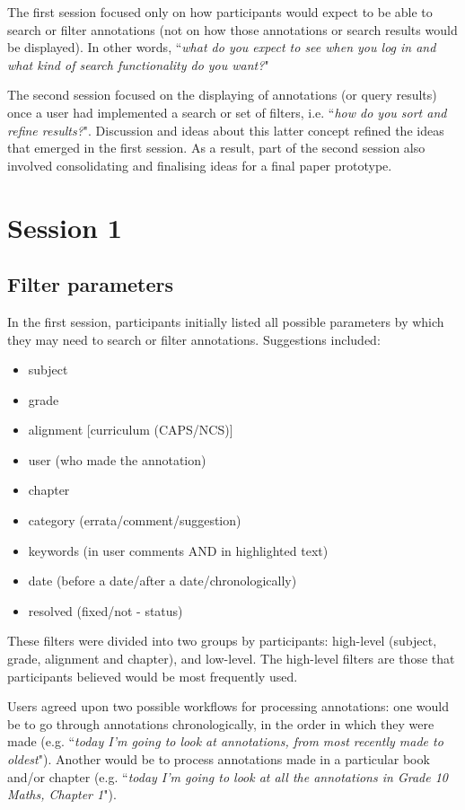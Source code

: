 The first session focused only on how participants would expect to be able to search or filter annotations (not on how those annotations or search results would be displayed). In other words, ``\textit{what do you expect to see when you log in and what kind of search functionality do you want?}"

The second session focused on the displaying of annotations (or query results) once a user had implemented a search or set of filters, i.e. ``\textit{how do you sort and refine results?}". Discussion and ideas about this latter concept refined the ideas that emerged in the first session. As a result, part of the second session also involved consolidating and finalising ideas for a final paper prototype.

\section{Session 1}

\subsection{Filter parameters}
In the first session, participants initially listed all possible parameters by which they may need to search or filter annotations. Suggestions included:
\begin{itemize}
\item subject
\item grade
\item alignment [curriculum (CAPS/NCS)]
\item user (who made the annotation)
\item chapter
\item category (errata/comment/suggestion)
\item keywords (in user comments AND in highlighted text)
\item date (before a date/after a date/chronologically)
\item resolved (fixed/not - status)
\end{itemize}

These filters were divided into two groups by participants: high-level (subject, grade, alignment and chapter), and low-level. The high-level filters are those that participants believed would be most frequently used. 

Users agreed upon two possible workflows for processing annotations: one would be to go through annotations chronologically, in the order in which they were made (e.g. ``\textit{today I'm going to look at annotations, from most recently made to oldest}"). Another would be to process annotations made in a particular book and/or chapter (e.g. ``\textit{today I'm going to look at all the annotations in Grade 10 Maths, Chapter 1}").

